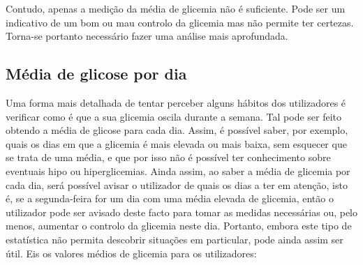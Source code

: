  Contudo, apenas a medição da média de glicemia não é suficiente. Pode ser um indicativo de um bom ou mau controlo da glicemia mas não permite ter certezas. Torna-se portanto necessário fazer uma análise mais aprofundada.



\subsection{Média de glicose por dia}

Uma forma mais detalhada de tentar perceber alguns hábitos dos utilizadores é verificar como é que a sua glicemia oscila durante a semana. Tal pode ser feito obtendo a média de glicose para cada dia. Assim, é possível saber, por exemplo, quais os dias em que a glicemia é mais elevada ou mais baixa, sem esquecer que se trata de uma média, e que por isso não é possível ter conhecimento sobre eventuais hipo ou hiperglicemias. Ainda assim, ao saber a média de glicemia por cada dia, será possível avisar o utilizador de quais os dias a ter em atenção, isto é, se a segunda-feira for um dia com uma média elevada de glicemia, então o utilizador pode ser avisado deste facto para tomar as medidas necessárias ou, pelo menos, aumentar o controlo da glicemia neste dia. Portanto, embora este tipo de estatística não permita descobrir situações em particular, pode ainda assim ser útil. Eis os valores médios de glicemia para os utilizadores:\newline




